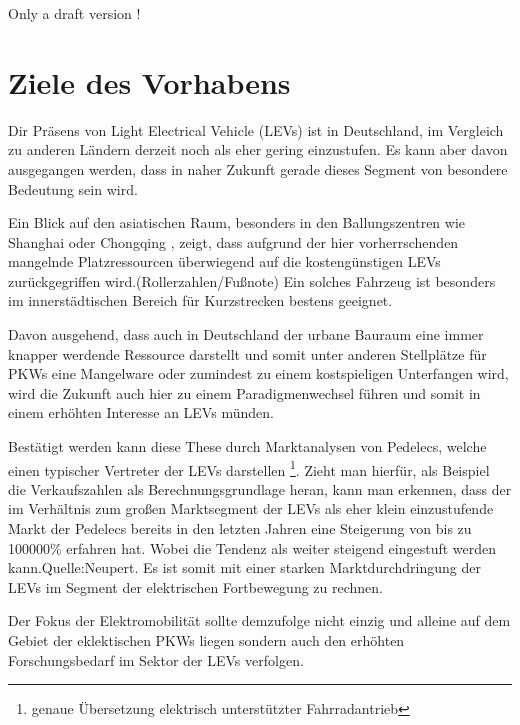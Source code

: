 Only a draft  version !

\chapter{Ziele des Vorhabens}
\label{sec:ZieleDesVorhabens}


Dir Präsens von Light Electrical Vehicle (LEVs) ist in Deutschland, im Vergleich zu anderen Ländern derzeit noch als eher gering einzustufen. Es kann aber davon ausgegangen werden, dass in naher Zukunft gerade dieses Segment von besondere Bedeutung sein wird. 

Ein Blick auf den asiatischen Raum, besonders in den Ballungszentren wie Shanghai oder Chongqing , zeigt, dass aufgrund der hier vorherrschenden mangelnde Platzressourcen überwiegend auf die kostengünstigen LEVs zurückgegriffen wird.(Rollerzahlen/Fußnote)
Ein solches Fahrzeug ist besonders im innerstädtischen Bereich für Kurzstrecken bestens geeignet.

Davon ausgehend, dass auch in Deutschland der urbane Bauraum eine immer knapper werdende Ressource darstellt und somit unter anderen Stellplätze für PKWs eine Mangelware oder zumindest zu einem  kostspieligen Unterfangen wird, wird die Zukunft auch hier zu einem Paradigmenwechsel führen und somit in einem erhöhten Interesse an LEVs münden.

Bestätigt werden kann diese These durch Marktanalysen von Pedelecs, welche einen typischer Vertreter der LEVs darstellen \footnote{ genaue Übersetzung elektrisch unterstützter Fahrradantrieb}. 
Zieht man hierfür, als Beispiel die Verkaufszahlen  als Berechnungsgrundlage heran, kann man erkennen, dass der im Verhältnis zum großen Marktsegment der LEVs als eher klein einzustufende Markt der Pedelecs bereits in den letzten Jahren eine Steigerung von bis zu 100000\% erfahren hat. Wobei die Tendenz als weiter steigend eingestuft werden kann.Quelle:Neupert.
Es ist somit mit einer starken Marktdurchdringung der LEVs im Segment der elektrischen Fortbewegung zu rechnen.

Der Fokus der Elektromobilität sollte demzufolge nicht einzig und alleine auf dem Gebiet der eklektischen PKWs liegen sondern auch den erhöhten Forschungsbedarf im Sektor der LEVs verfolgen.

